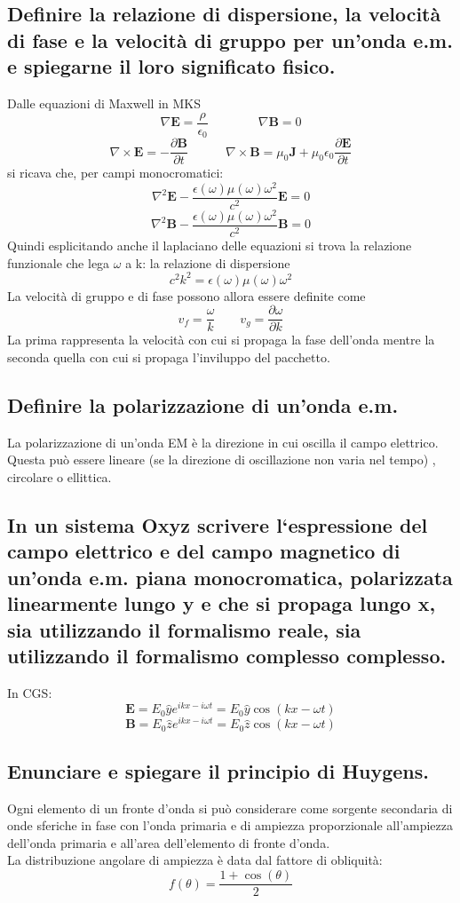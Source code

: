 \subsection[]{ Definire la relazione di dispersione, la velocità di fase e la velocità di gruppo per un’onda e.m. e spiegarne il loro significato fisico. }
Dalle equazioni di Maxwell in MKS
\[
	\nabla \boldsymbol{E} = \frac{\rho}{\epsilon_0} \quad \quad \quad \quad 
	\nabla \boldsymbol{B} = 0 
\] 
\[
	\nabla \times \boldsymbol{E} = - \frac{\partial \boldsymbol{B} }{\partial t} \quad \quad \quad
	\nabla \times \boldsymbol{B} = \mu_0 \boldsymbol{J} + \mu_0 \epsilon_0 \frac{\partial \boldsymbol{E} }{\partial t} 
\] 
si ricava che, per campi monocromatici:	
\[
	\nabla^{2}\boldsymbol{E} - \frac{\epsilon\left( \omega \right) \mu \left( \omega \right) \omega^{2}}{c^{2}}\boldsymbol{E} = 0 
\]
\[
	\nabla^{2}\boldsymbol{B} - \frac{\epsilon\left( \omega \right) \mu \left( \omega \right) \omega^{2}}{c^{2}}\boldsymbol{B} = 0
\] 
Quindi esplicitando anche il laplaciano delle equazioni si trova la relazione funzionale che lega $\omega$ a k: la relazione di dispersione
\[
	c^{2}k^{2} = \epsilon \left( \omega \right) \mu \left( \omega \right) \omega^{2}
\] 
La velocità di gruppo e di fase possono allora essere definite come
\[
v_{f} = \frac{\omega}{k} \quad \quad 
v_{g} = \frac{\partial \omega}{\partial k} 
\]
La prima rappresenta la velocità con cui si propaga la fase dell'onda mentre la seconda quella con cui si propaga l'inviluppo del pacchetto. 
\subsection[]{ Definire la polarizzazione di un’onda e.m.}
La polarizzazione di un'onda EM è la direzione in cui oscilla il campo elettrico. Questa può essere lineare (se la direzione di oscillazione non varia nel tempo) , circolare o ellittica.
\subsection[]{ In un sistema Oxyz scrivere l‘espressione del campo elettrico e del campo magnetico di un’onda e.m. piana monocromatica, polarizzata linearmente lungo y e che si propaga lungo x, sia utilizzando il formalismo reale, sia utilizzando il formalismo complesso complesso.}
In CGS:
\[
	\boldsymbol{E} = E_{0} \hat{y} e^{ikx - i\omega t} = E_{0} \hat{y} \cos\left( kx - \omega t \right)   
\] 
\[
	\boldsymbol{B} = E_{0} \hat{z} e^{ikx - i\omega t} = E_{0} \hat{z} \cos\left( kx - \omega t \right)  
\] 
\subsection[]{ Enunciare e spiegare il principio di Huygens.}
Ogni elemento di un fronte d'onda si può considerare come sorgente secondaria di onde sferiche in fase con l'onda primaria e di ampiezza proporzionale all'ampiezza dell'onda primaria e all'area dell'elemento di fronte d'onda. \\
La distribuzione angolare di ampiezza è data dal fattore di obliquità:
\[
	f\left( \theta \right) = \frac{1 + \cos\left( \theta \right) }{2} 
\] 
